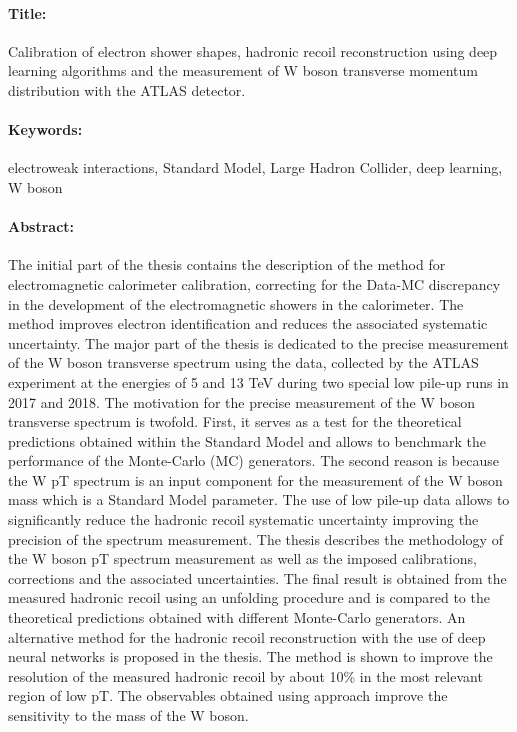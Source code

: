\thispagestyle{empty}
\begin{mdframed}[linecolor=Prune,linewidth=1]
\vspace{-.25cm}
\paragraph*{Title:} Calibration of electron shower shapes, hadronic recoil reconstruction using deep learning algorithms and the measurement of W boson transverse momentum distribution with the ATLAS detector.

\begin{small}
\vspace{-.25cm}
\paragraph*{Keywords:} electroweak interactions, Standard Model, Large Hadron Collider, deep learning, W boson

\vspace{-.5cm}
\begin{multicols}{2}
\paragraph*{Abstract:} The initial part of the thesis contains the description of the method for electromagnetic calorimeter calibration, correcting for the Data-MC discrepancy in the development of the electromagnetic showers in the calorimeter. The method improves electron identification and reduces the associated systematic uncertainty. 
The major part of the thesis is dedicated to the precise measurement of the W boson transverse spectrum using the data, collected by the ATLAS experiment at the energies of 5 and 13 TeV during two special low pile-up runs in 2017 and 2018. 
The motivation for the precise measurement of the W boson transverse spectrum is twofold. First, it serves as a test for the theoretical predictions obtained within the Standard Model and allows to benchmark the performance of the Monte-Carlo (MC) generators. The second reason is because the W pT spectrum is an input component for the measurement of the W boson mass which is a Standard Model parameter. The use of low pile-up data allows to significantly reduce the hadronic recoil systematic uncertainty improving the precision of the spectrum measurement.
The thesis describes the methodology of the W boson pT spectrum measurement as well as the imposed calibrations, corrections and the associated uncertainties. The final result is obtained from the measured hadronic recoil using an unfolding procedure and is compared to the theoretical predictions obtained with different Monte-Carlo generators. 
An alternative method for the hadronic recoil reconstruction with the use of deep neural networks is proposed in the thesis. The method is shown to improve the resolution of the measured hadronic recoil by about 10\% in the most relevant region of low pT. The observables obtained using approach improve the sensitivity to the mass of the W boson.
\end{multicols}
\end{small}
\end{mdframed}

